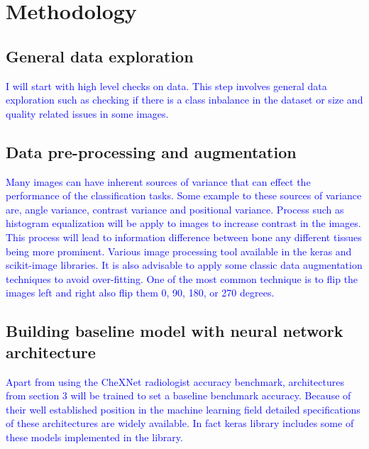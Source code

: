 \documentclass[12pt, twoside, a4paper]{article}
\begin{document}
\section{Methodology}
\subsection{General data exploration}
\textcolor{blue}{I will start with high level checks on data. This step involves general data exploration such as checking if there is a class inbalance in the dataset or size and quality related issues in some images.}

\subsection{Data pre-processing and augmentation}
\textcolor{blue}{Many images can have inherent sources of variance that can effect the performance of the classification tasks. Some example to these sources of variance are, angle variance, contrast variance and positional variance. Process such as histogram equalization will be apply to images to increase contrast in the images. This process will lead to information difference between bone any different tissues being more prominent. Various image processing tool available in the keras \cite{keras} and scikit-image \cite{skimage} libraries. 
It is also advisable to apply some classic data augmentation techniques to avoid over-fitting. One of the most common technique is to flip the images left and right also flip them 0, 90, 180, or 270 degrees.}

\subsection{Building baseline model with neural network architecture}
\textcolor{blue}{Apart from using the CheXNet \cite{CheXNetRP} radiologist accuracy benchmark, architectures from section 3 will be trained to set a baseline benchmark accuracy. Because of their well established position in the machine learning field detailed specifications of these architectures are widely available. In fact keras library \cite{keras} includes some of these models implemented in the library.}

\end{document}
